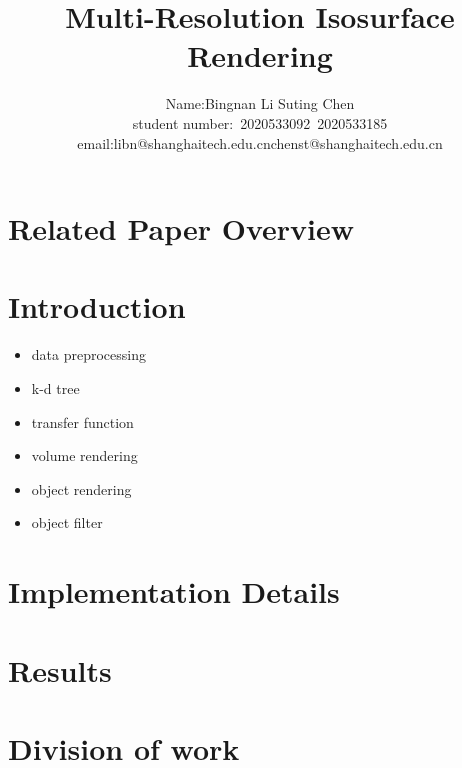 \documentclass[acmtog]{acmart}
\title{Multi-Resolution Isosurface Rendering}
\author{Name:\quad Bingnan Li \quad Suting Chen \\ student number:\ 2020533092\ 2020533185
\\email:\quad libn@shanghaitech.edu.cn\quad chenst@shanghaitech.edu.cn}
\begin{document}
    \maketitle

    \vspace*{2 ex}


    \section{Related Paper Overview}\label{sec:related-paper-overview}


    \section{Introduction}\label{sec:introduction}
    \begin{itemize}
        \item data preprocessing
        \item k-d tree
        \item transfer function
        \item volume rendering
        \item object rendering
        \item object filter
    \end{itemize}


    \section{Implementation Details}\label{sec:implementation-details}


    \section{Results}\label{sec:results}


    \section{Division of work}\label{sec:division-of-work}
\end{document}
